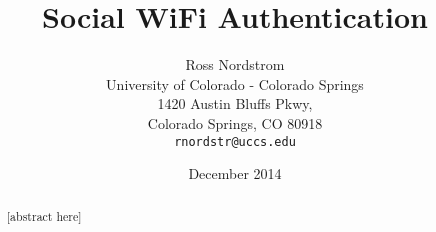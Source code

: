 \documentclass{sig-alternate}
\begin{document}
\title{Social WiFi Authentication}
\author{Ross Nordstrom\\
        University of Colorado - Colorado Springs\\
        1420 Austin Bluffs Pkwy,\\
        Colorado Springs, CO 80918\\
        \texttt{rnordstr@uccs.edu}
       }
\date{December 2014}

\maketitle

\begin{abstract}
   [abstract here]
\end{abstract}










{}



\end{document}
